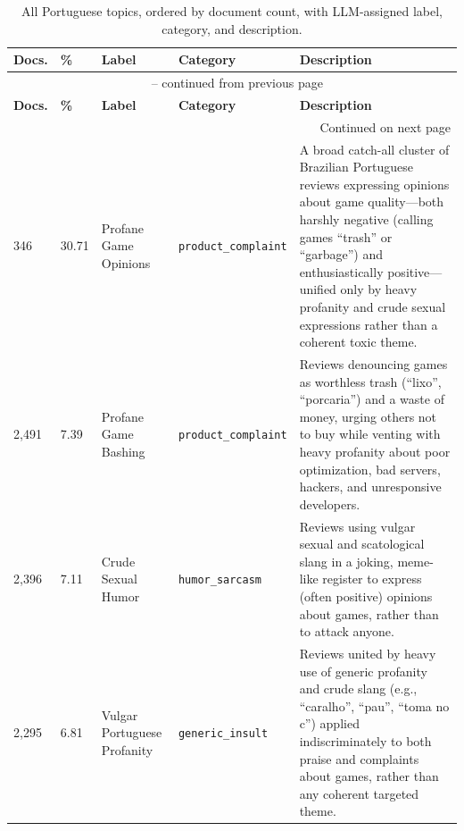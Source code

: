 {\tiny
{}
\begin{longtable}{p{0.9cm}p{0.6cm}p{3cm}lp{6.1cm}}
    \caption{All Portuguese topics, ordered by document count, with LLM-assigned label, category, and description.} \label{tab:semantic-topics-pt} \\
    \toprule
    \textbf{Docs.} & \textbf{\%} & \textbf{Label} & \textbf{Category} & \textbf{Description} \\
    \midrule
    \endfirsthead
    \multicolumn{5}{c}{\tablename\ \thetable{} -- continued from previous page} \\
    \toprule
    \textbf{Docs.} & \textbf{\%} & \textbf{Label} & \textbf{Category} & \textbf{Description} \\
    \midrule
    \endhead
    \midrule
    \multicolumn{5}{r}{Continued on next page} \\
    \endfoot
    \bottomrule
    \endlastfoot
    10{,}346 & 30.71 & Profane Game Opinions & \texttt{product\_\allowbreak complaint} & A broad catch-all cluster of Brazilian Portuguese reviews expressing opinions about game quality---both harshly negative (calling games ``trash'' or ``garbage'') and enthusiastically positive---unified only by heavy profanity and crude sexual expressions rather than a coherent toxic theme. \\
    2{,}491 & 7.39 & Profane Game Bashing & \texttt{product\_\allowbreak complaint} & Reviews denouncing games as worthless trash (``lixo'', ``porcaria'') and a waste of money, urging others not to buy while venting with heavy profanity about poor optimization, bad servers, hackers, and unresponsive developers. \\
    2{,}396 & 7.11 & Crude Sexual Humor & \texttt{humor\_\allowbreak sarcasm} & Reviews using vulgar sexual and scatological slang in a joking, meme-like register to express (often positive) opinions about games, rather than to attack anyone. \\
    2{,}295 & 6.81 & Vulgar Portuguese Profanity & \texttt{generic\_\allowbreak insult} & Reviews united by heavy use of generic profanity and crude slang (e.g., ``caralho'', ``pau'', ``toma no c'') applied indiscriminately to both praise and complaints about games, rather than any coherent targeted theme. \\

\end{longtable}}

